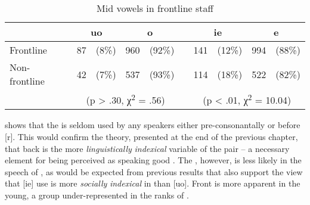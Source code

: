  
\begin{table}
\begin{tabularx}{\textwidth}{l X *{2}{r@{ }r} X *{2}{r@{ }r}}
\lsptoprule
 &  & \multicolumn{2}{c}{uo}  &  \multicolumn{2}{c}{o}  & &  \multicolumn{2}{c}{ie}  &  \multicolumn{2}{c}{e} \\\midrule
Frontline     & & 87 & (8\%) &   960 & (92\%) & & 141 & (12\%) & 994 & (88\%) \\
Non-frontline & & 42 & (7\%) &   537 & (93\%) & & 114 & (18\%) & 522 & (82\%) \\\cmidrule(lr){3-6}\cmidrule(lr){8-11}
      & &  \multicolumn{4}{c}{(p > .30, χ\textsuperscript{2} = .56) }    &        &  \multicolumn{4}{c}{(p < .01, χ\textsuperscript{2} = 10.04)}\\                      
\midrule
\end{tabularx}
\caption{Mid vowels in frontline staff\label{tab:4.10}}
\end{table}

   shows that the  is seldom used by any speakers either pre-consonantally or before [r].  This would confirm the theory, presented at the end of the previous chapter, that back  is the more \textit{linguistically} \textit{indexical} variable of the pair -- a necessary element for being perceived as speaking good .  The , however, is less likely in the speech of , as would be expected from previous results that also support the view that [ie] use is more \textit{socially} \textit{indexical} in  than [uo].   Front  is more apparent in the young, a group under-represented in the ranks of .  

